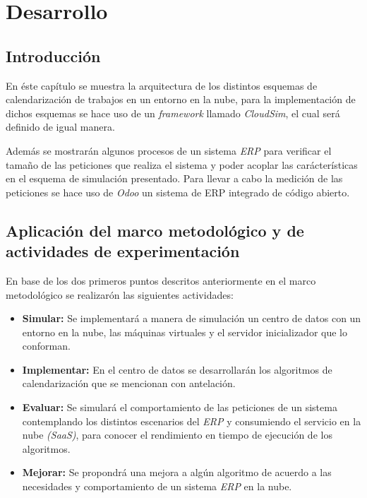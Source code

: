 \chead{}
\rhead{\thepage}



\chapter{Desarrollo}
\section*{Introducci\'on}

En \'este cap\'itulo se muestra la arquitectura de los distintos esquemas de calendarizaci\'on de trabajos en un entorno en la nube, para la implementaci\'on de dichos esquemas se hace uso de un \textit{framework} llamado \textit{CloudSim}, el cual ser\'a definido de igual manera.


Además se mostrarán algunos procesos de un sistema \textit{ERP} para verificar el tamaño de las peticiones que realiza el sistema y poder acoplar las carácterísticas en el esquema de simulación presentado. Para llevar a cabo la medición de las peticiones se hace uso de \textit{Odoo} un sistema de ERP integrado de código abierto.




\newpage
{}
\section{Aplicaci\'on del marco metodol\'ogico y de actividades de experimentaci\'on}

En base de los dos primeros puntos descritos anteriormente en el marco metodol\'ogico se realizar\'on las siguientes actividades:

\begin{itemize}
	\item \textbf{Simular:} Se implementar\'a a manera de simulaci\'on un centro de datos con un entorno en la nube, las m\'aquinas virtuales y el servidor inicializador que lo conforman.
	\item \textbf{Implementar:} En el centro de datos se desarrollar\'an los algoritmos de calendarizaci\'on que se mencionan con antelaci\'on.
	\item \textbf{Evaluar:} Se simular\'a el comportamiento de las peticiones de un sistema contemplando los distintos escenarios del \textit{ERP} y consumiendo el servicio en la nube \textit{(SaaS)}, para conocer el rendimiento en tiempo de ejecuci\'on de los algoritmos.
	\item \textbf{Mejorar:} Se propondr\'a una mejora a alg\'un algoritmo de acuerdo a las necesidades y comportamiento de un sistema \textit{ERP} en la nube.
\end{itemize}

